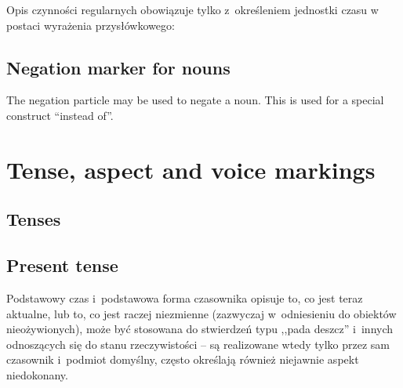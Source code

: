Opis czynności regularnych obowiązuje tylko z~określeniem jednostki czasu w
postaci wyrażenia przysłówkowego:






\subsection{Negation marker for nouns}

The negation particle  may be used to negate a noun. This is used for
a special construct ``instead of''.


\section{Tense, aspect and voice markings}
\label{sec:markers}

\subsection{Tenses}

\subsection{Present tense}

Podstawowy czas i~podstawowa forma czasownika opisuje to, co jest teraz
aktualne, lub to, co jest raczej niezmienne (zazwyczaj w~odniesieniu do obiektów
nieożywionych), może być stosowana do stwierdzeń typu ,,pada deszcz'' i~innych
odnoszących się do stanu rzeczywistości -- są realizowane wtedy tylko przez sam
czasownik i~podmiot domyślny, często określają również niejawnie aspekt
niedokonany.



